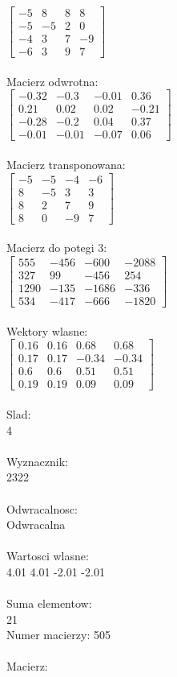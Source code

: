 \documentclass[a4paper,12pt]{article}
\begin{document}
$\begin{bmatrix} -5&8&8&8\\-5&-5&2&0\\-4&3&7&-9\\-6&3&9&7 \end{bmatrix}$
\\
\\
Macierz odwrotna:\\

$\begin{bmatrix} -0.32&-0.3&-0.01&0.36\\0.21&0.02&0.02&-0.21\\-0.28&-0.2&0.04&0.37\\-0.01&-0.01&-0.07&0.06 \end{bmatrix}$
\\
\\
Macierz transponowana:\\

$\begin{bmatrix} -5&-5&-4&-6\\8&-5&3&3\\8&2&7&9\\8&0&-9&7 \end{bmatrix}$
\\
\\
Macierz do potegi 3:\\

$\begin{bmatrix} 555&-456&-600&-2088\\327&99&-456&254\\1290&-135&-1686&-336\\534&-417&-666&-1820 \end{bmatrix}$
\\
\\
Wektory wlasne:\\

$\begin{bmatrix} 0.16&0.16&0.68&0.68\\0.17&0.17&-0.34&-0.34\\0.6&0.6&0.51&0.51\\0.19&0.19&0.09&0.09 \end{bmatrix}$
\\
\\
Slad:\\
4
\\
\\
Wyznacznik:\\
2322
\\
\\
Odwracalnosc:\\
Odwracalna
\\
\\
Wartosci wlasne:\\
4.01 4.01 -2.01 -2.01
\\
\\
Suma elementow:\\
21
\\
\newpage
Numer macierzy:
505
\\
\\
Macierz:\\
\end{document}
